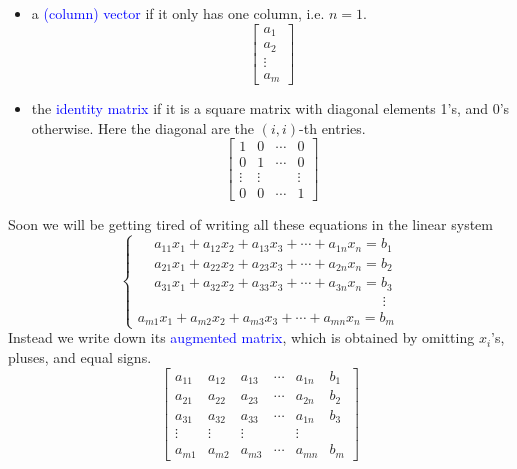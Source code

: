 \documentclass{beamer}
\theoremstyle{definition}
\theoremstyle{remark}
\begin{document}
\begin{frame}[t]
\begin{definition}
\begin{itemize}
\item a \textcolor{blue}{(column) vector} if it only has one column, i.e. $n=1$.
\[
\begin{bmatrix}
a_{1}\\a_{2}\\\vdots\\a_{m}
\end{bmatrix}
\]
\pause
\item the \textcolor{blue}{identity matrix} if it is a square matrix with diagonal elements 1's, and 0's otherwise. Here the diagonal are the $(i,i)$-th entries.
\[
\begin{bmatrix}
1&0&\cdots&0\\
0&1&\cdots&0\\
\vdots&\vdots&&\vdots\\
0&0&\cdots&1
\end{bmatrix}
\]
\end{itemize}
\end{definition}
\end{frame}

\begin{frame}[t]
\begin{definition}
Soon we will be getting tired of writing all these equations in the linear system
\[
\begin{cases}
\,\quad a_{11}x_1+a_{12}x_2+a_{13}x_3+\cdots+a_{1n}x_{n}=b_1 \\
\,\quad a_{21}x_1+a_{22}x_2+a_{23}x_3+\cdots+a_{2n}x_{n}=b_2 \\
\quad \,a_{31}x_1+a_{32}x_2+a_{33}x_3+\cdots+a_{3n}x_{n}=b_3 \\
\,\,\,\qquad\qquad\qquad\qquad\qquad\qquad\qquad\qquad\quad\vdots \\
a_{m1}x_1+a_{m2}x_2+a_{m3}x_3+\cdots+a_{mn}x_{n}=b_m
\end{cases}
\]
Instead we write down its \textcolor{blue}{augmented matrix}, which is obtained by omitting $x_i$'s, pluses, and equal signs.
\[
\begin{bmatrix}
a_{11}&a_{12}&a_{13}&\cdots&a_{1n}&b_1\\
a_{21}&a_{22}&a_{23}&\cdots&a_{2n}&b_2\\
a_{31}&a_{32}&a_{33}&\cdots&a_{1n}&b_3\\
\vdots&\vdots&\vdots&&\vdots\\
a_{m1}&a_{m2}&a_{m3}&\cdots&a_{mn}&b_m
\end{bmatrix}
\]
\end{definition}
\end{frame}
\end{document}
